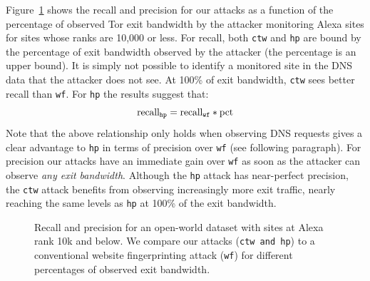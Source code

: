Figure~\ref{fig:fpt:torpct} shows the recall and precision for our \name
attacks as a function of the percentage of observed Tor exit bandwidth by the
attacker monitoring Alexa sites for sites whose ranks are 10,000 or less.
For recall, both \texttt{ctw} and \texttt{hp} are bound by the
percentage of exit bandwidth observed by the attacker (the percentage is an
upper bound).
It is simply not possible to identify a monitored site in the DNS data that
the attacker does not see. At 100\% of exit bandwidth, \texttt{ctw} sees
better recall than \texttt{wf}. For \texttt{hp} the results suggest that:
\begin{equation}
	\label{eq:hprecall}
	\textnormal{recall}_{\texttt{hp}} = \textnormal{recall}_{\texttt{wf}} * \textnormal{pct}
\end{equation}
Note that the above relationship only holds when observing DNS requests gives
a clear advantage to \texttt{hp} in terms of precision over \texttt{wf} (see
following paragraph).
For precision our attacks have an immediate gain over \texttt{wf} as soon as
the attacker can observe \emph{any exit bandwidth}.
Although the \texttt{hp} attack has near-perfect precision, the
\texttt{ctw} attack benefits from observing increasingly more exit traffic,
nearly reaching the same levels as \texttt{hp} at 100\% of the exit bandwidth.


\begin{figure}[t]
\centering
{}
\caption{Recall and precision for an open-world dataset with sites
at Alexa rank 10k and below. We compare our attacks (\texttt{ctw and
 \texttt{hp}}) to a conventional website fingerprinting attack (\texttt{wf}) for different
 percentages of observed exit bandwidth. }
\label{fig:fpt:torpct}
\end{figure}


